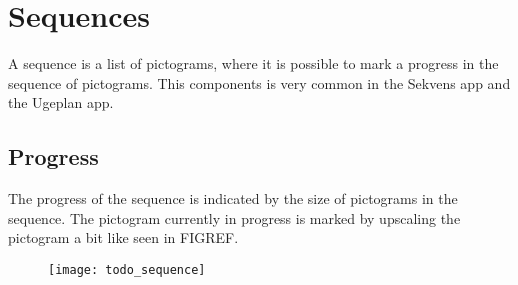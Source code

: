
\chapter{Sequences}
\label{cha:sequences}

A sequence is a list of pictograms, where it is possible to mark a progress in the sequence of pictograms. This components is very common in the Sekvens app and the Ugeplan app.

\section{Progress}
\label{sec:progress}

The progress of the sequence is indicated by the size of pictograms in the sequence. The pictogram currently in progress is marked by upscaling the pictogram a bit like seen in FIGREF.



\begin{figure}[!htbp]
		\centering
		\texttt{[image: todo\_sequence]}
	\end{figure}